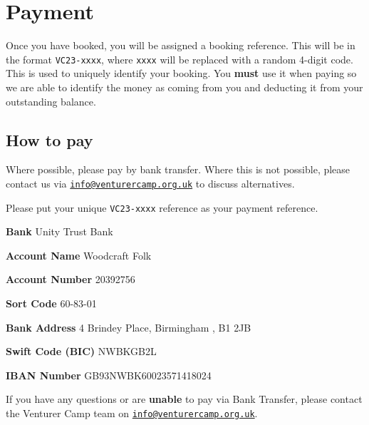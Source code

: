 \chapter{Payment}

Once you have booked, you will be assigned a booking reference. This will be in the format \verb|VC23-xxxx|, where \verb|xxxx| will be replaced with a random 4-digit code. This is used to uniquely identify your booking. You \textbf{must} use it when paying so we are able to identify the money as coming from you and deducting it from your outstanding balance.

\section{How to pay}
Where possible, please pay by bank transfer. Where this is not possible, please contact us via \href{mailto:info@venturercamp.org.uk}{\texttt{info@venturercamp.org.uk}} to discuss alternatives.

Please put your unique \verb|VC23-xxxx| reference as your  payment reference.

\textbf{Bank} Unity Trust Bank

\textbf{Account Name} Woodcraft Folk  

\textbf{Account Number} 20392756   

\textbf{Sort Code}  60-83-01  

\textbf{Bank Address} 4 Brindey Place, Birmingham , B1 2JB  

\textbf{Swift Code (BIC)} NWBKGB2L  

\textbf{IBAN Number} GB93NWBK60023571418024  

If you have any questions or are \textbf{unable} to pay via Bank Transfer, please contact the Venturer Camp team on \href{mailto:info@venturercamp.org.uk}{\texttt{info@venturercamp.org.uk}}.  